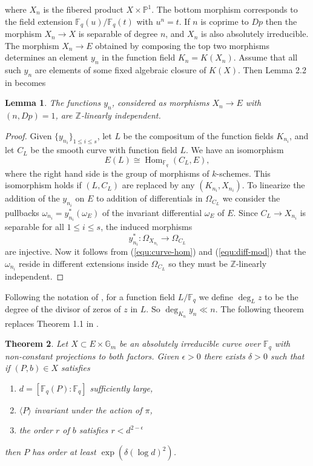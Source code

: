 \documentclass[review]{elsarticle}
\theoremstyle{plain}
\newtheorem{theorem}{Theorem}
\newtheorem{lemma}[theorem]{Lemma}
\theoremstyle{definition}
\newcommand{\ang}[1]{\langle#1\rangle}
\DeclareMathOperator{\Hom}{Hom}
\def\Z{\ensuremath{\mathbb{Z}}}
\def\F{\ensuremath{\mathbb{F}}}
\def\P{\ensuremath{\mathbb{P}}}
\begin{document}
where $X_n$ is the fibered product $X \times \P^1$. The bottom morphism corresponds to the field 
extension $\F_q(u)/\F_q(t)$ with $u^n = t$. If $n$ is coprime to $Dp$ then the morphism $X_n 
\rightarrow X$ is separable of degree $n$, and $X_n$ is also absolutely irreducible. The morphism 
$X_n \rightarrow E$ obtained by composing the top two morphisms determines an element $y_n$ in the 
function field $K_n = K(X_n)$. Assume that all such $y_n$ are elements of some fixed algebraic 
closure of $K(X)$. Then Lemma 2.2 in \cite{voloch2010} becomes
\begin{lemma}
	The functions $y_n$, considered as morphisms $X_n \rightarrow E$ with $(n, Dp) = 1$, are 
	$\Z$-linearly independent.
\end{lemma}
\begin{proof}
	Given $\{y_{n_i}\}_{1 \le i \le s}$, let $L$ be the compositum of the function fields $K_{n_i}$,
	and let $C_L$ be the smooth curve with function field $L$. We have an isomorphism 
	\begin{equation}
	\label{equ:curve-hom}
		E(L) \cong \Hom_{\F_q}(C_L, E),
	\end{equation}
	where the right hand side is the group of morphisms of $k$-schemes. This isomorphism holds if 
	$(L, C_L)$ are replaced by any $(K_{n_i}, X_{n_i})$. To linearize the addition of the $y_{n_i}$ 
	on $E$ to addition of differentials in $\Omega_{C_L}$ we consider the pullbacks $\omega_{n_i} = 
	y_{n_i}^*(\omega_E)$ of the invariant differential $\omega_E$ of $E$. Since $C_L \rightarrow 
	X_{n_i}$ is separable for all $1 \le i \le s$, the induced morphisms
	\begin{equation}
	\label{equ:diff-mod}
	y_{n_i}^*: \Omega_{X_{n_i}} \longrightarrow \Omega_{C_L}
	\end{equation}
	are injective. Now it follows from (\ref{equ:curve-hom}) and (\ref{equ:diff-mod}) that the 
	$\omega_{n_i}$ reside in different extensions inside $\Omega_{C_L}$ so they must be 
	$\Z$-linearly independent.
\end{proof}
Following the notation of \cite{voloch2010}, for a function field $L/\F_q$ we define $\deg_Lz$ to 
be the degree of the divisor of zeros of $z$ in $L$. So $\deg_{K_n}y_n \ll n$. The following 
theorem replaces Theorem 1.1 in \cite{voloch2010}.
\begin{theorem}
	\label{theo:order-general}
	Let $X \subset E \times \mathbb{G}_m$ be an absolutely irreducible curve over $\F_q$ with 
	non-constant projections to both factors. Given $\epsilon > 0$ there exists $\delta > 0$ such 
	that if $(P, b) \in X$ satisfies
	\begin{enumerate}[leftmargin = *, labelsep = *, align = left, itemsep = -0.1cm, font = 
	\normalfont, label = (\roman*)]
		\item $d = [\F_q(P) : \F_q]$ sufficiently large,
		\item $\ang{P}$ invariant under the action of $\pi$,
		\item the order $r$ of $b$ satisfies $r < d^{2 - \epsilon}$
	\end{enumerate}
	then $P$ has order at least $\exp(\delta (\log d)^2)$.
\end{theorem}
\end{document}
